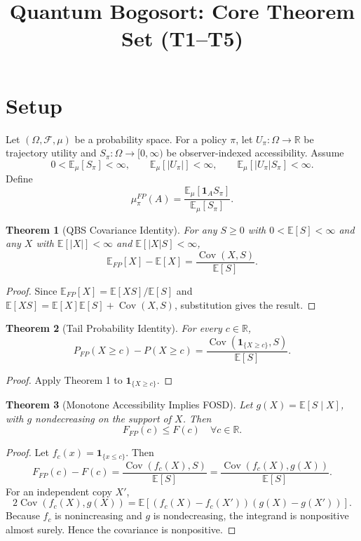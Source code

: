 \documentclass[11pt]{article}
\newtheorem{theorem}{Theorem}
\newcommand{\E}{\mathbb E}
\newcommand{\Cov}{\operatorname{Cov}}
\begin{document}
\title{Quantum Bogosort: Core Theorem Set (T1--T5)}
\author{}
\date{}
\maketitle

\section{Setup}
Let $(\Omega,\mathcal F,\mu)$ be a probability space. For a policy $\pi$, let
$U_\pi:\Omega\to\mathbb R$ be trajectory utility and
$S_\pi:\Omega\to[0,\infty)$ be observer-indexed accessibility.
Assume
\[
0<\E_\mu[S_\pi]<\infty,\qquad
\E_\mu[|U_\pi|]<\infty,\qquad
\E_\mu[|U_\pi|S_\pi]<\infty.
\]
Define
\[
\mu^{FP}_\pi(A)=\frac{\E_\mu[\mathbf 1_A S_\pi]}{\E_\mu[S_\pi]}.
\]

\begin{theorem}[QBS Covariance Identity]
For any $S\ge0$ with $0<\E[S]<\infty$ and any $X$ with $\E[|X|]<\infty$ and $\E[|X|S]<\infty$,
\[
\E_{FP}[X]-\E[X]=\frac{\Cov(X,S)}{\E[S]}.
\]
\end{theorem}
\begin{proof}
Since $\E_{FP}[X]=\E[XS]/\E[S]$ and
$\E[XS]=\E[X]\E[S]+\Cov(X,S)$, substitution gives the result.
\end{proof}

\begin{theorem}[Tail Probability Identity]
For every $c\in\mathbb R$,
\[
P_{FP}(X\ge c)-P(X\ge c)
=
\frac{\Cov(\mathbf 1_{\{X\ge c\}},S)}{\E[S]}.
\]
\end{theorem}
\begin{proof}
Apply Theorem 1 to $\mathbf 1_{\{X\ge c\}}$.
\end{proof}

\begin{theorem}[Monotone Accessibility Implies FOSD]
Let $g(X)=\E[S\mid X]$, with $g$ nondecreasing on the support of $X$.
Then
\[
F_{FP}(c)\le F(c)\quad\forall c\in\mathbb R.
\]
\end{theorem}
\begin{proof}
Let $f_c(x)=\mathbf1_{\{x\le c\}}$. Then
\[
F_{FP}(c)-F(c)=\frac{\Cov(f_c(X),S)}{\E[S]}
=\frac{\Cov(f_c(X),g(X))}{\E[S]}.
\]
For an independent copy $X'$,
\[
2\Cov(f_c(X),g(X))
=
\E[(f_c(X)-f_c(X'))(g(X)-g(X'))].
\]
Because $f_c$ is nonincreasing and $g$ is nondecreasing, the integrand is
nonpositive almost surely. Hence the covariance is nonpositive.
\end{proof}
\end{document}
